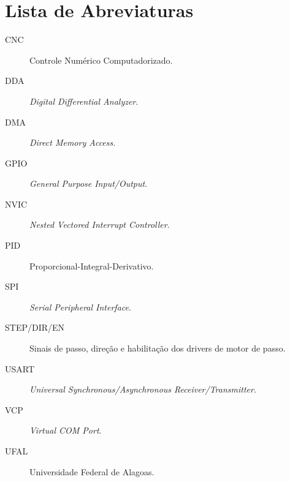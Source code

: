 \chapter*{Lista de Abreviaturas}

\begin{description}
  \item[CNC] \quad Controle Numérico Computadorizado.
  \item[DDA] \quad \emph{Digital Differential Analyzer}.
  \item[DMA] \quad \emph{Direct Memory Access}.
  \item[GPIO] \quad \emph{General Purpose Input/Output}.
  \item[NVIC] \quad \emph{Nested Vectored Interrupt Controller}.
  \item[PID] \quad Proporcional-Integral-Derivativo.
  \item[SPI] \quad \emph{Serial Peripheral Interface}.
  \item[STEP/DIR/EN] \quad Sinais de passo, direção e habilitação dos drivers de motor de passo.
  \item[USART] \quad \emph{Universal Synchronous/Asynchronous Receiver/Transmitter}.
  \item[VCP] \quad \emph{Virtual COM Port}.
  \item[UFAL] \quad Universidade Federal de Alagoas.
\end{description}
